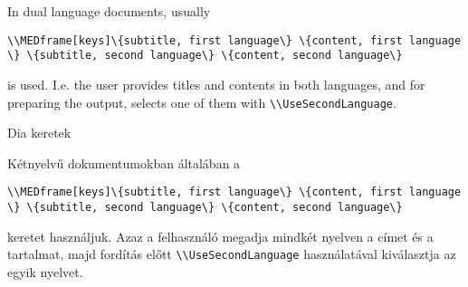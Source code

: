 
{
In dual language documents, usually 
\par\noindent\lstinline|\\MEDframe[keys]\{subtitle, first language\} \{content, first language \} \{subtitle, second language\} \{content, second language\}|
\par\noindent is used. I.e. the user provides titles and contents in both languages,
and for preparing the output, selects one of them with \lstinline|\\UseSecondLanguage|.
}
{Dia keretek}
{
Kétnyelvű dokumentumokban általában a
\par\noindent\lstinline|\\MEDframe[keys]\{subtitle, first language\} \{content, first language \} \{subtitle, second language\} \{content, second language\}|
\par\noindent  keretet használjuk. Azaz a felhasználó megadja mindkét nyelven
a címet és a tartalmat, majd fordítás előtt \lstinline|\\UseSecondLanguage|
használatával kiválasztja az egyik nyelvet.
}


